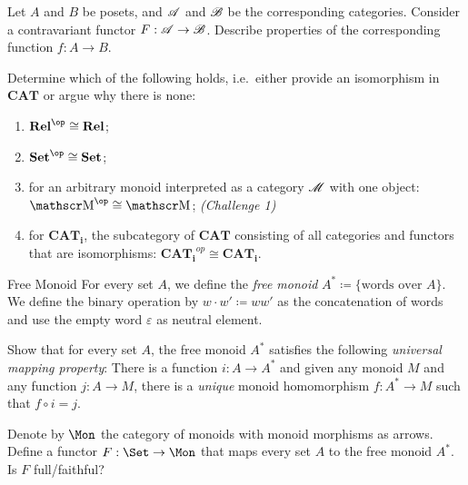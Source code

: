 \begin{exercise}
  Let $A$ and $B$ be posets, and $\operatorname{\mathscr A}$ and $\operatorname{\mathscr B}$ be the corresponding categories. Consider a contravariant functor $F:\operatorname{\mathscr A}\rightarrow \operatorname{\mathscr B}$. Describe properties of the corresponding function $f:A\rightarrow B$.
\end{exercise}

\begin{exercise}
  Determine which of the following holds, i.e.\ either provide an isomorphism in $\mathbf{CAT}$ or argue why there is none:

  \begin{enumerate}
  \item $\mathbf {Rel}^{\op}\cong \mathbf {Rel}$;
  \item $\mathbf {Set}^{\op}\cong \mathbf {Set}$;
  \item for an arbitrary monoid interpreted as a category $\operatorname{\mathscr M}$ with one object:  $\M^{\op}\cong \M$; \textit{(Challenge 1)}
  \item for $\mathbf{CAT_i}$, the subcategory of $\mathbf{CAT}$ consisting of all categories and functors that are isomorphisms: $\mathbf{CAT_i}^{op}\cong\mathbf{CAT_i}$.
  \end{enumerate}

\end{exercise}

\begin{definition}{Free Monoid}
  For every set $A$, we define the \emph{free monoid} $A^* \coloneqq \lbrace \text{words over $A$} \rbrace$.
  We define the binary operation by $w \cdot w' \coloneqq ww'$ as the concatenation of words and use the empty word $\varepsilon$ as neutral element.
\end{definition}

\begin{exercise}
  Show that for every set $A$, the free monoid $A^*$ satisfies the following \emph{universal mapping property}:
  There is a function $i : A \to A^*$ and given any monoid $M$ and any function $j : A \to M$, there is a \emph{unique} monoid homomorphism $f : A^* \to M$ such that $f \circ i = j$.
\end{exercise}

\begin{exercise}
  Denote by $\Mon$ the category of monoids with monoid morphisms as arrows.
  Define a functor $F : \Set \to \Mon$ that maps every set $A$ to the free monoid $A^*$.
  Is $F$ full/faithful?
\end{exercise}

